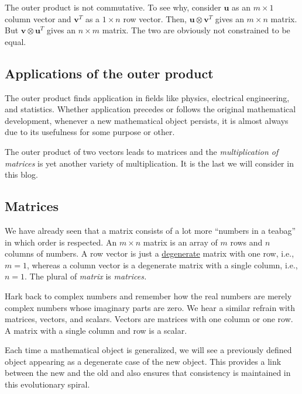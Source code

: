 \documentclass[
  a4paper,
]{article}
\begin{document}
The outer product is not commutative. To see why, consider \(\symbf{u}\)
as an \(m \times 1\) column vector and \(\symbf{v}^{T}\) as a
\(1 \times n\) row vector. Then, \(\symbf{u} \otimes \symbf{v}^{T}\)
gives an \(m \times n\) matrix. But \(\symbf{v} \otimes \symbf{u}^{T}\)
gives an \(n \times m\) matrix. The two are obviously not constrained to
be equal.

\hypertarget{applications-of-the-outer-product}{%
\subsection{Applications of the outer
product}\label{applications-of-the-outer-product}}

The outer product finds application in fields like physics, electrical
engineering, and statistics. Whether application precedes or follows the
original mathematical development, whenever a new mathematical object
persists, it is almost always due to its usefulness for some purpose or
other.

The outer product of two vectors leads to matrices and the
\emph{multiplication of matrices} is yet another variety of
multiplication. It is the last we will consider in this blog.

\hypertarget{matrices}{%
\subsection{Matrices}\label{matrices}}

We have already seen that a matrix consists of a lot more ``numbers in a
teabag'' in which order is respected. An \(m \times n\) matrix is an
array of \(m\) rows and \(n\) columns of numbers. A row vector is just a
\href{https://en.wikipedia.org/wiki/Degenerate_\%28mathematics\%29}{degenerate}
matrix with one row, i.e., \(m = 1\), whereas a column vector is a
degenerate matrix with a single column, i.e., \(n = 1\). The plural of
\emph{matrix} is \emph{matrices.}

Hark back to complex numbers and remember how the real numbers are
merely complex numbers whose imaginary parts are zero. We hear a similar
refrain with matrices, vectors, and scalars. Vectors are matrices with
one column or one row. A matrix with a single column and row is a
scalar.

Each time a mathematical object is generalized, we will see a previously
defined object appearing as a degenerate case of the new object. This
provides a link between the new and the old and also ensures that
consistency is maintained in this evolutionary spiral.
\end{document}
